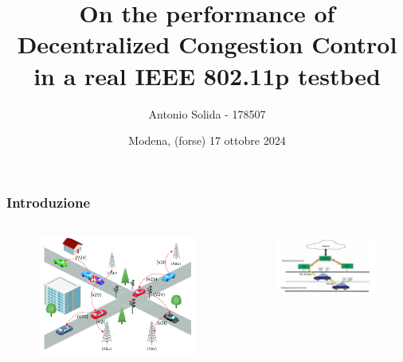 \documentclass{beamer}
\title[DCC performance in IEEE 802.11p] %
{On the performance of Decentralized Congestion Control in a real IEEE 802.11p testbed}
\author{Antonio Solida - 178507}
\institute[] %
{
    \textbf{Relatore: Prof. Carlo Augusto Grazia}
    \and
    Corso di Laurea Magistrale in Ingegneria Informatica\\
    Curriculum: Cloud \& Cybersecurity\\
    Esame di Automotive Cybersecurity
    \and
    Dipartimento di Ingegneria "Enzo Ferrari"\\
    Università di Modena e Reggio Emilia
}
\date[17 ottobre 2024] %
{Modena, (forse) 17 ottobre 2024}
\begin{document}
\frame{\titlepage}

\begin{frame}
\frametitle{Introduzione}
\begin{columns}
    \begin{column}{0.5\textwidth}
        \begin{figure}[h!]
            \centering
            \includegraphics[width=1\textwidth]{vanet.png}
            \label{fig:vanet}
        \end{figure}
    \end{column}
    \begin{column}{0.5\textwidth}
        \begin{figure}[h!]
            \centering
            \includegraphics[width=1\textwidth]{routing_vanet.jpeg}
            \label{fig:obu_rsu}
        \end{figure}
    \end{column}
\end{columns}
\end{frame}
\end{document}
